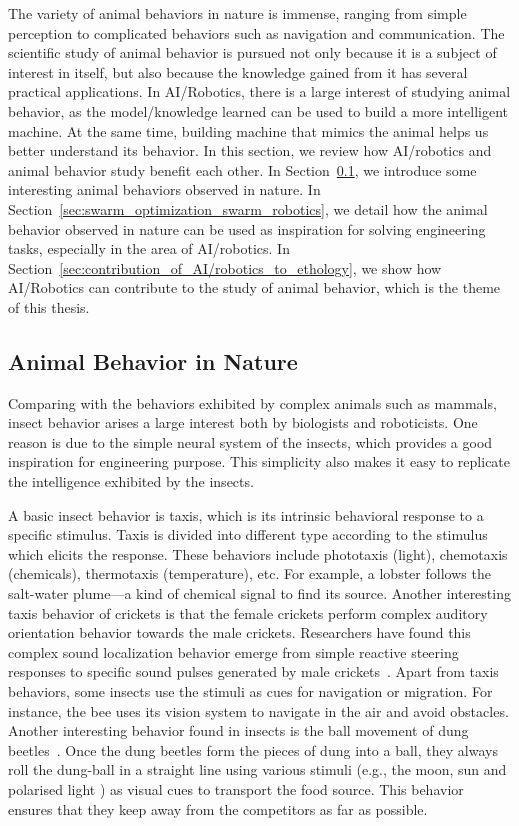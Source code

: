 The variety of animal behaviors in nature is immense, ranging from simple perception to complicated behaviors such as navigation and communication. The scientific study of animal behavior is pursued not only because it is a subject of interest in itself, but also because the knowledge gained from it has several practical applications. In AI/Robotics, there is a large interest of studying animal behavior, as the model/knowledge learned can be used to build a more intelligent machine. At the same time, building machine that mimics the animal helps us better understand its behavior. In this section, we review how AI/robotics and animal behavior study benefit each other. In Section~\ref{sec:animal_behavior_in_nature}, we introduce some interesting animal behaviors observed in nature. In Section~\ref{sec:swarm_optimization_swarm_robotics}, we detail how the animal behavior observed in nature can be used as inspiration for solving engineering tasks, especially in the area of AI/robotics. In Section~\ref{sec:contribution_of_AI/robotics_to_ethology}, we show how AI/Robotics can contribute to the study of animal behavior, which is the theme of this thesis.

\subsection{Animal Behavior in Nature}\label{sec:animal_behavior_in_nature}

Comparing with the behaviors exhibited by complex animals such as mammals, insect behavior arises a large interest both by biologists and roboticists. One reason is due to the simple neural system of the insects, which provides a good inspiration for engineering purpose. This simplicity also makes it easy to replicate the intelligence exhibited by the insects. 

A basic insect behavior is taxis, which is its intrinsic behavioral response to a specific stimulus. Taxis is divided into different type according to the stimulus which elicits the response. These behaviors include phototaxis (light), chemotaxis (chemicals), thermotaxis (temperature), etc. For example, a lobster follows the salt-water plume---a kind of chemical signal to find its source. Another interesting taxis behavior of crickets is that the female crickets perform complex auditory orientation behavior towards the male crickets. Researchers have found this complex sound localization behavior emerge from simple reactive steering responses to specific sound pulses generated by male crickets~\cite{Hedwig2004}. Apart from taxis behaviors, some insects use the stimuli as cues for navigation or migration. For instance, the bee uses its vision system to navigate in the air and avoid obstacles. Another interesting behavior found in insects is the ball movement of dung beetles~\cite{Emily_2012}. Once the dung beetles form the pieces of dung into a ball, they always roll the dung-ball in a straight line using various stimuli (e.g., the moon, sun and polarised light \cite{Byrne_2003, Matthews_1962}) as visual cues to transport the food source. This behavior ensures that they keep away from the competitors as far as possible. 
 
